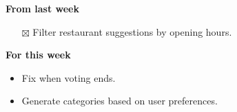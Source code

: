 \documentclass[12pt,letterpaper]{article}
\newcommand{\done}{$\boxtimes$}
\begin{document}
\textbf{From last week}
\begin{itemize}
  \item[\done] Filter restaurant suggestions by opening hours.
\end{itemize}


\textbf{For this week}
\begin{itemize}
  \item Fix when voting ends.
  \item Generate categories based on user preferences.
\end{itemize}
\end{document}
